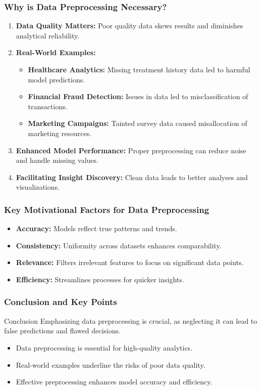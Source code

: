 \documentclass[aspectratio=169]{beamer}
\begin{document}
\begin{frame}[fragile]
    \frametitle{Why is Data Preprocessing Necessary?}
    \begin{enumerate}
        \item \textbf{Data Quality Matters:} Poor quality data skews results and diminishes analytical reliability.
        
        \item \textbf{Real-World Examples:}
        \begin{itemize}
            \item \textbf{Healthcare Analytics:} Missing treatment history data led to harmful model predictions.
            \item \textbf{Financial Fraud Detection:} Issues in data led to misclassification of transactions.
            \item \textbf{Marketing Campaigns:} Tainted survey data caused misallocation of marketing resources.
        \end{itemize}
        
        \item \textbf{Enhanced Model Performance:} Proper preprocessing can reduce noise and handle missing values.
        
        \item \textbf{Facilitating Insight Discovery:} Clean data leads to better analyses and visualizations.
    \end{enumerate}
\end{frame}

\begin{frame}[fragile]
    \frametitle{Key Motivational Factors for Data Preprocessing}
    \begin{itemize}
        \item \textbf{Accuracy:} Models reflect true patterns and trends.
        \item \textbf{Consistency:} Uniformity across datasets enhances comparability.
        \item \textbf{Relevance:} Filters irrelevant features to focus on significant data points.
        \item \textbf{Efficiency:} Streamlines processes for quicker insights.
    \end{itemize}
\end{frame}

\begin{frame}[fragile]
    \frametitle{Conclusion and Key Points}
    \begin{block}{Conclusion}
        Emphasizing data preprocessing is crucial, as neglecting it can lead to false predictions and flawed decisions.
    \end{block}

    \begin{itemize}
        \item Data preprocessing is essential for high-quality analytics.
        \item Real-world examples underline the risks of poor data quality.
        \item Effective preprocessing enhances model accuracy and efficiency.
    \end{itemize}
\end{frame}
\end{document}
